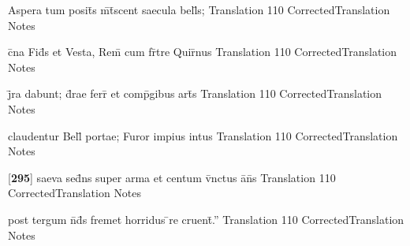 \documentclass[]{book}
\begin{document}
\latline
  {Aspera tum posit\={\macron {\i}}s m\={\macron {\i}}t\={}scent saecula bell\={\macron {\i}}s;}
  { Translation }
  {110}
  { CorrectedTranslation }
  { Notes }


\latline
  {c\={}na Fid\={}s et Vesta, Rem\={} cum fr\={}tre Quir\={\macron {\i}}nus}
  { Translation }
  {110}
  { CorrectedTranslation }
  { Notes }


\latline
  {j\={}ra dabunt; d\={\macron {\i}}rae ferr\={} et comp\={}gibus art\={\macron {\i}}s}
  { Translation }
  {110}
  { CorrectedTranslation }
  { Notes }


\latline
  {claudentur Bell\={\macron {\i}} portae; Furor impius intus}
  { Translation }
  {110}
  { CorrectedTranslation }
  { Notes }


\latline
  {[\textbf{295}] saeva sed\={}ns super arma et centum v\={\macron {\i}}nctus a\={}n\={\macron {\i}}s}
  { Translation }
  {110}
  { CorrectedTranslation }
  { Notes }


\latline
  {post tergum n\={}d\={\macron {\i}}s fremet horridus \={}re cruent\={}.''}
  { Translation }
  {110}
  { CorrectedTranslation }
  { Notes }
\end{document}
